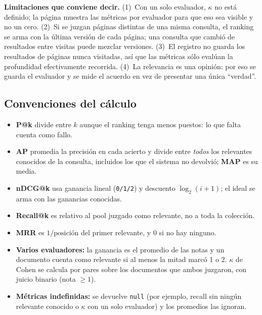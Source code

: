\documentclass[11pt,spanish]{article}
\begin{document}
\textbf{Limitaciones que conviene decir.} (1)~Con un solo evaluador, $\kappa$
no está definido; la página muestra las métricas por evaluador para que eso sea
visible y no un cero. (2)~Si se juzgan páginas distintas de una misma consulta,
el ranking se arma con la última versión de cada página; una consulta que cambió
de resultados entre visitas puede mezclar versiones. (3)~El registro no guarda
los resultados de páginas nunca visitadas, así que las métricas sólo evalúan la
profundidad efectivamente recorrida. (4)~La relevancia es una opinión: por eso
se guarda el evaluador y se mide el acuerdo en vez de presentar una única
``verdad''.

\subsection{Convenciones del cálculo}
\label{sec:convenciones-metricas}

\begin{itemize}[leftmargin=1.4em,itemsep=2pt]
  \item \textbf{P@k} divide entre $k$ aunque el ranking tenga menos puestos: lo
    que falta cuenta como fallo.
  \item \textbf{AP} promedia la precisión en cada acierto y divide entre
    \emph{todos} los relevantes conocidos de la consulta, incluidos los que el
    sistema no devolvió; \textbf{MAP} es su media.
  \item \textbf{nDCG@k} usa ganancia lineal (\texttt{0/1/2}) y descuento
    $\log_2(i+1)$; el ideal se arma con las ganancias conocidas.
  \item \textbf{Recall@k} es relativo al pool juzgado como relevante, no a toda
    la colección.
  \item \textbf{MRR} es $1/\text{posición}$ del primer relevante, y 0 si no hay
    ninguno.
  \item \textbf{Varios evaluadores:} la ganancia es el promedio de las notas y
    un documento cuenta como relevante si al menos la mitad marcó 1 o 2.
    $\kappa$ de Cohen se calcula por pares sobre los documentos que ambos
    juzgaron, con juicio binario (nota $\geq 1$).
  \item \textbf{Métricas indefinidas:} se devuelve \texttt{null} (por ejemplo,
    recall sin ningún relevante conocido o $\kappa$ con un solo evaluador) y
    los promedios las ignoran.
\end{itemize}

\end{document}
